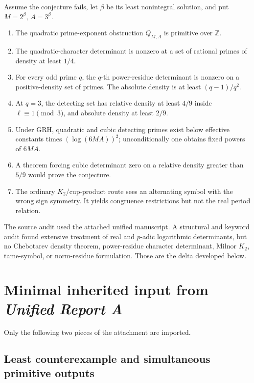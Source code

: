 \documentclass[11pt]{article}
\numberwithin{equation}{section}
\theoremstyle{definition}
\theoremstyle{remark}
\newcommand{\Z}{\mathbb Z}
\newcommand{\ReportA}{\textit{Unified Report A}}
\begin{document}
\begin{resultbox}
Assume the conjecture fails, let \(\beta\) be its least nonintegral solution, and put
\(M=2^\beta\), \(A=3^\beta\).
\begin{enumerate}
\item The quadratic prime-exponent obstruction \(Q_{M,A}\) is primitive over \(\Z\).
\item The quadratic-character determinant is nonzero at a set of rational primes of density
at least \(1/4\).
\item For every odd prime \(q\), the \(q\)-th power-residue determinant is nonzero on a
positive-density set of primes.  The absolute density is at least \((q-1)/q^2\).
\item At \(q=3\), the detecting set has relative density at least \(4/9\) inside
\(\ell\equiv1\pmod3\), and absolute density at least \(2/9\).
\item Under GRH, quadratic and cubic detecting primes exist below effective constants times
\((\log(6MA))^2\); unconditionally one obtains fixed powers of \(6MA\).
\item A theorem forcing cubic determinant zero on a relative density greater than \(5/9\)
would prove the conjecture.
\item The ordinary \(K_2\)/cup-product route sees an alternating symbol with the wrong sign
symmetry.  It yields congruence restrictions but not the real period relation.
\end{enumerate}
\end{resultbox}

The source audit used the attached unified manuscript.  A structural and keyword audit found
extensive treatment of real and \(p\)-adic logarithmic
determinants, but no Chebotarev density theorem, power-residue character determinant, Milnor
\(K_2\), tame-symbol, or norm-residue formulation.  Those are the delta developed below.

\section{Minimal inherited input from \ReportA}
\label{sec:inherited}

Only the following two pieces of the attachment are imported.

\subsection{Least counterexample and simultaneous primitive outputs}
\end{document}
